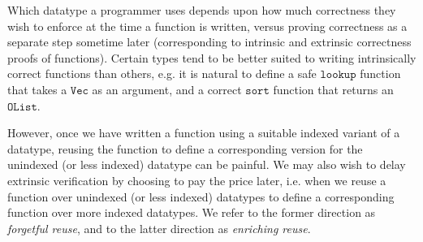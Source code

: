 \documentclass[acmsmall]{acmart}\settopmatter{}
\newcommand{\txt}[1]{\ensuremath{\texttt{#1}}}
\begin{document}
Which datatype a programmer uses depends upon how much correctness
they wish to enforce at the time a function is written, versus proving
correctness as a separate step sometime later (corresponding to
intrinsic and extrinsic correctness proofs of functions). Certain
types tend to be better suited to writing intrinsically correct
functions than others, e.g. it is natural to define a safe \txt{lookup}
function that takes a \txt{Vec} as an argument, and a correct \txt{sort}
function that returns an \txt{OList}.

However, once we have written a function using a suitable indexed
variant of a datatype, reusing the function to define a corresponding version
for the unindexed (or less indexed) datatype can be
painful. We may also wish to delay extrinsic verification by choosing
to pay the price later, i.e. when we reuse a function over unindexed (or less
indexed) datatypes to define a corresponding function over
more indexed datatypes. We refer to the former direction as
\textit{forgetful reuse}, and to the latter direction as
\textit{enriching reuse}.
\end{document}
